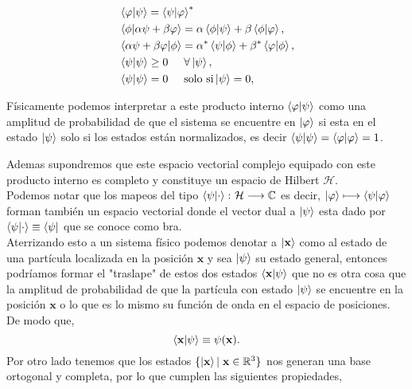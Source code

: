 \begin{equation*}
    \begin{split}
        &\braket{\varphi}{\psi}=\braket{\psi}{\varphi}^{*}\\
        &\braket{\phi}{\alpha\psi+\beta\varphi}=\alpha\braket{\phi}{\psi}+\beta\braket{\phi}{\varphi},\\
        &\braket{\alpha\psi+\beta\varphi}{\phi}=\alpha^{*}\braket{\psi}{\phi}+\beta^{*}\braket{\varphi}{\phi},\\
        &\braket{\psi}{\psi}\geq 0 \hspace{0.5cm} \forall \ket{\psi},\\
        &\braket{\psi}{\psi}=0 \hspace{0.5cm} \text{solo si} \ket{\psi}=0,
    \end{split}
\end{equation*}

Físicamente podemos interpretar a este producto interno $ \braket{\varphi}{\psi} $ como una amplitud de probabilidad de que el sistema se encuentre en $ \ket{\varphi} $ si esta en el estado $ \ket{\psi} $ solo si los estados están normalizados, es decir $ \braket{\psi}{\psi}=\braket{\varphi}{\varphi}=1 $.

Ademas supondremos que este espacio vectorial complejo equipado con este producto interno es completo y constituye un espacio de Hilbert $\mathcal{H}$.\\

Podemos notar que los  mapeos del tipo $ \braket{\psi}{\cdot}\colon \mathcal{H}\longrightarrow \mathbb{C} $ es decir,  $\ket{\varphi}  \longmapsto \braket{\psi}{\varphi}$ forman también un espacio vectorial donde el vector dual a $ \ket{\psi} $ esta dado por $ \braket{\psi}{\cdot}\equiv\bra{\psi} $ que se conoce como bra.\\

Aterrizando esto a un sistema físico podemos denotar a $ \ket{\textbf{x}} $ como al estado de una partícula localizada en la posición $ \textbf{x} $ y sea $ \ket{\psi} $ su estado general, entonces podríamos formar el "traslape" de estos dos estados $ \braket{\textbf{x}}{\psi} $ que no es otra cosa que la amplitud de probabilidad de que la partícula con estado $ \ket{\psi} $ se encuentre en la posición $ \textbf{x} $ o lo que es lo mismo su función de onda en el espacio de posiciones. De modo que,
\begin{equation*}
\braket{\textbf{x}}{\psi}\equiv \psi(\textbf{x}).  
\end{equation*}  
Por otro lado tenemos que los estados $\{ \ket{\textbf{x}} \arrowvert \hspace{0.1cm} \textbf{x}\in \mathbb{R}^{3} \}$ nos generan una base ortogonal y completa, por lo que cumplen las siguientes propiedades,   

